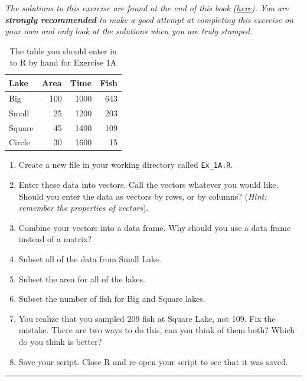 \documentclass[]{book}
\providecommand{\tightlist}{%
  \setlength{\itemsep}{0pt}\setlength{\parskip}{0pt}}
\theoremstyle{definition}
\theoremstyle{definition}
\theoremstyle{definition}
\theoremstyle{remark}
\begin{document}
\emph{The solutions to this exercise are found at the end of this book
(\protect\hyperlink{ex1a-answers}{here}). You are \textbf{strongly
recommended} to make a good attempt at completing this exercise on your
own and only look at the solutions when you are truly stumped.}

\begin{table}

\caption{\label{tab:ex-1-table-pdf}The table you should enter in to R by hand for Exercise 1A}
\centering
\begin{tabular}[t]{l|r|r|r}
\hline
Lake & Area & Time & Fish\\
\hline
Big & 100 & 1000 & 643\\
\hline
Small & 25 & 1200 & 203\\
\hline
Square & 45 & 1400 & 109\\
\hline
Circle & 30 & 1600 & 15\\
\hline
\end{tabular}
\end{table}

\begin{enumerate}
\def\labelenumi{\arabic{enumi}.}
\tightlist
\item
  Create a new file in your working directory called \texttt{Ex\_1A.R}.
\item
  Enter these data into vectors. Call the vectors whatever you would
  like. Should you enter the data as vectors by rows, or by columns?
  (\emph{Hint: remember the properties of vectors}).
\item
  Combine your vectors into a data frame. Why should you use a data
  frame instead of a matrix?
\item
  Subset all of the data from Small Lake.
\item
  Subset the area for all of the lakes.
\item
  Subset the number of fish for Big and Square lakes.
\item
  You realize that you sampled 209 fish at Square Lake, not 109. Fix the
  mistake. There are two ways to do this, can you think of them both?
  Which do you think is better?
\item
  Save your script. Close R and re-open your script to see that it was
  saved.
\end{enumerate}

\begin{center}\rule{0.5\linewidth}{\linethickness}\end{center}
\end{document}
